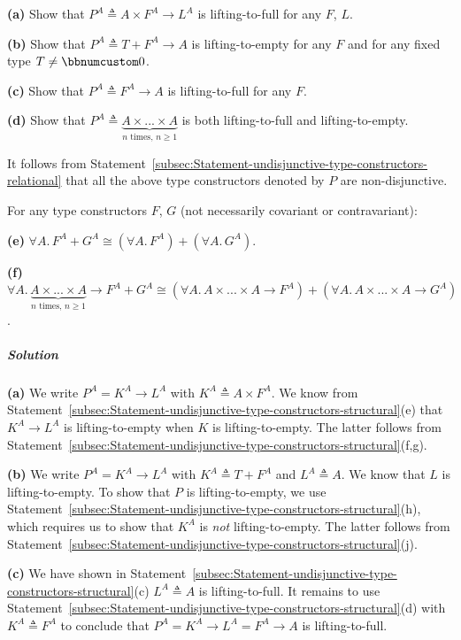 \textbf{(a)} Show that $P^{A}\triangleq A\times F^{A}\rightarrow L^{A}$
is lifting-to-full for any $F$, $L$.

\textbf{(b)} Show that $P^{A}\triangleq T+F^{A}\rightarrow A$ is
lifting-to-empty for any $F$ and for any fixed type $T\not=\bbnum 0$.

\textbf{(c)} Show that $P^{A}\triangleq F^{A}\rightarrow A$ is lifting-to-full
for any $F$.

\textbf{(d)} Show that $P^{A}\triangleq\underbrace{A\times...\times A}_{n\text{ times, }n\geq1}$
is both lifting-to-full and lifting-to-empty.

It follows from Statement~\ref{subsec:Statement-undisjunctive-type-constructors-relational}
that all the above type constructors denoted by $P$ are non-disjunctive. 

For any type constructors $F$, $G$ (not necessarily covariant or
contravariant):

\textbf{(e)} $\forall A.\,F^{A}+G^{A}\cong(\forall A.\,F^{A})+(\forall A.\,G^{A})$.

\textbf{(f)} $\forall A.\,\underbrace{A\times...\times A}_{n\text{ times, }n\geq1}\rightarrow F^{A}+G^{A}\cong(\forall A.\,A\times...\times A\rightarrow F^{A})+(\forall A.\,A\times...\times A\rightarrow G^{A})$.

\subparagraph{Solution}

\textbf{(a)} We write $P^{A}=K^{A}\rightarrow L^{A}$ with $K^{A}\triangleq A\times F^{A}$.
We know from Statement~\ref{subsec:Statement-undisjunctive-type-constructors-structural}(e)
that $K^{A}\rightarrow L^{A}$ is lifting-to-empty when $K$ is lifting-to-empty.
The latter follows from Statement~\ref{subsec:Statement-undisjunctive-type-constructors-structural}(f,g).

\textbf{(b)} We write $P^{A}=K^{A}\rightarrow L^{A}$ with $K^{A}\triangleq T+F^{A}$
and $L^{A}\triangleq A$. We know that $L$ is lifting-to-empty. To
show that $P$ is lifting-to-empty, we use Statement~\ref{subsec:Statement-undisjunctive-type-constructors-structural}(h),
which requires us to show that $K^{A}$ is \emph{not} lifting-to-empty.
The latter follows from Statement~\ref{subsec:Statement-undisjunctive-type-constructors-structural}(j).

\textbf{(c)} We have shown in Statement~\ref{subsec:Statement-undisjunctive-type-constructors-structural}(c)
$L^{A}\triangleq A$ is lifting-to-full. It remains to use Statement~\ref{subsec:Statement-undisjunctive-type-constructors-structural}(d)
with $K^{A}\triangleq F^{A}$ to conclude that $P^{A}=K^{A}\rightarrow L^{A}=F^{A}\rightarrow A$
is lifting-to-full.

